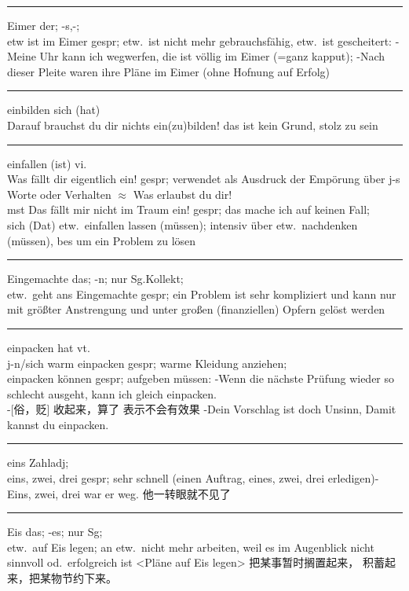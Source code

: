 \noindent\rule{\textwidth}{1pt}
Eimer der; -s,-;\\
etw ist im Eimer gespr; etw.\ ist nicht mehr gebrauchsf\"ahig, etw.\ ist gescheitert: -Meine Uhr kann ich wegwerfen, die ist v\"ollig im Eimer (=ganz kapput); -Nach dieser Pleite waren ihre Pl\"ane im Eimer (ohne Hofnung auf Erfolg)

\noindent\rule{\textwidth}{1pt}
einbilden sich (hat)\\
Darauf brauchst du dir nichts ein(zu)bilden! das ist kein Grund, stolz zu sein

\noindent\rule{\textwidth}{1pt}
einfallen (ist) vi. \\
Was f\"allt dir eigentlich ein! gespr; verwendet als Ausdruck der Emp\"orung \"uber j-s Worte oder Verhalten $\approx$
Was erlaubst du dir! \\
mst Das f\"allt mir nicht im Traum ein! gespr; das mache ich auf keinen Fall; \\
sich (Dat) etw.\ einfallen lassen (m\"ussen); intensiv \"uber etw.\  nachdenken (m\"ussen), bes um ein Problem zu l\"osen

\noindent\rule{\textwidth}{1pt}
Eingemachte das; -n; nur Sg.Kollekt;\\
etw.\ geht ans Eingemachte gespr; ein Problem ist sehr kompliziert und kann nur mit gr\"o\ss{}ter Anstrengung und unter gro\ss{}en (finanziellen) Opfern gel\"ost werden \\

\noindent\rule{\textwidth}{1pt}
einpacken hat vt.\ \\
j-n/sich warm einpacken gespr; warme Kleidung anziehen; \\
einpacken k\"onnen gespr; aufgeben m\"ussen: -Wenn die n\"achste Pr\"ufung wieder so schlecht ausgeht, kann ich gleich einpacken. \\ 
-[俗，贬] 收起来，算了 表示不会有效果 -Dein Vorschlag ist doch Unsinn, Damit kannst du einpacken.\\

\noindent\rule{\textwidth}{1pt}
eins Zahladj;\\
eins, zwei, drei gespr; sehr schnell (einen Auftrag, eines, zwei, drei erledigen)-Eins, zwei, drei war er weg. 他一转眼就不见了\\

\noindent\rule{\textwidth}{1pt}
Eis das; -es; nur Sg; \\
etw.\  auf Eis legen; an etw.\  nicht mehr arbeiten, weil es im Augenblick nicht sinnvoll od.\ erfolgreich ist <Pl\"ane auf Eis legen> 把某事暂时搁置起来， 积蓄起来，把某物节约下来。

